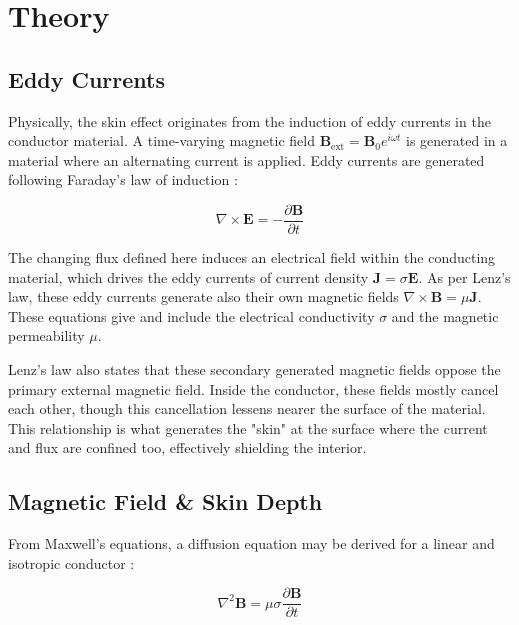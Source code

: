 \documentclass[11pt, a4paper, twocolumn]{article}
\begin{document}
\section{Theory} \label{sec:2}

\subsection{Eddy Currents}

Physically, the skin effect originates from the induction of eddy currents in the conductor material. A time-varying magnetic field $ \mathbf{B}_{\text{ext}} = \mathbf{B}_0 e^{i \omega t} $ is generated in a material where an alternating current is applied. Eddy currents are generated following Faraday's law of induction \cite{griffiths2023introduction}:

\begin{equation*}
  \nabla \times \mathbf{E} = - \frac{\partial \mathbf{B}}{\partial t}
\end{equation*}

The changing flux defined here induces an electrical field within the conducting material, which drives the eddy currents of current density $ \mathbf{J} = \sigma \mathbf{E} $. As per Lenz's law, these eddy currents generate also their own magnetic fields $ \nabla \times \mathbf{B} = \mu \mathbf{J} $. These equations give and include the electrical conductivity $ \sigma $ and the magnetic permeability $ \mu $. \cite{griffiths2023introduction}

Lenz's law also states that these secondary generated magnetic fields oppose the primary external magnetic field. Inside the conductor, these fields mostly cancel each other, though this cancellation lessens nearer the surface of the material. This relationship is what generates the "skin" at the surface where the current and flux are confined too, effectively shielding the interior. \cite{griffiths2023introduction}

\subsection{Magnetic Field \& Skin Depth}

From Maxwell's equations, a diffusion equation may be derived for a linear and isotropic conductor \cite{griffiths2023introduction}:

\begin{equation*}
  \nabla^2 \mathbf{B} = \mu\sigma \frac{\partial \mathbf{B}}{\partial t}
\end{equation*}
\end{document}
